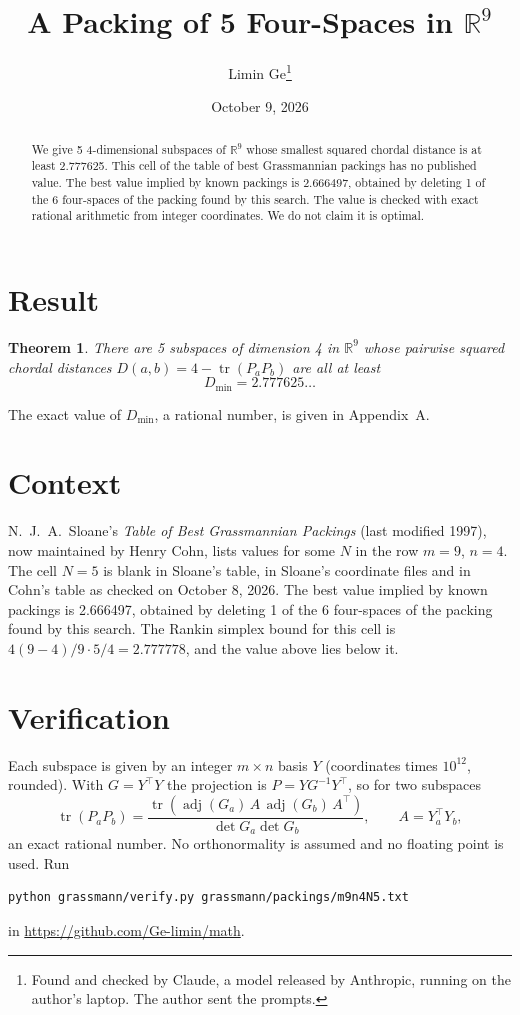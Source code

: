 \documentclass[11pt,a4paper]{article}
\title{A Packing of 5 Four-Spaces in $\mathbb{R}^{9}$}
\author{Limin Ge\thanks{Found and checked by Claude, a model released by Anthropic, running on the author's laptop. The author sent the prompts.}}
\date{October 9, 2026}
\newtheorem*{theorem}{Theorem}
\begin{document}
\maketitle
\begin{abstract}
We give 5 4-dimensional subspaces of $\mathbb{R}^{9}$ whose smallest squared chordal distance is at least 2.777625. This cell of the table of best Grassmannian packings has no published value. The best value implied by known packings is 2.666497, obtained by deleting 1 of the 6 four-spaces of the packing found by this search. The value is checked with exact rational arithmetic from integer coordinates. We do not claim it is optimal.
\end{abstract}

\section{Result}
\begin{theorem}
There are 5 subspaces of dimension 4 in $\mathbb{R}^{9}$ whose pairwise squared chordal distances $D(a,b) = 4 - \operatorname{tr}(P_aP_b)$ are all at least
\[ D_{\min} = 2.777625\ldots \]
\end{theorem}
The exact value of $D_{\min}$, a rational number, is given in Appendix~A.


\section{Context}
N.~J.~A.~Sloane's \emph{Table of Best Grassmannian Packings} (last modified 1997), now maintained by Henry Cohn, lists values for some $N$ in the row $m=9$, $n=4$. The cell $N=5$ is blank in Sloane's table, in Sloane's coordinate files and in Cohn's table as checked on October 8, 2026. The best value implied by known packings is 2.666497, obtained by deleting 1 of the 6 four-spaces of the packing found by this search. The Rankin simplex bound for this cell is $4(9-4)/9\cdot 5/4 = 2.777778$, and the value above lies below it.


\section{Verification}
Each subspace is given by an integer $m\times n$ basis $Y$ (coordinates times $10^{12}$, rounded). With $G=Y^\top Y$ the projection is $P=YG^{-1}Y^\top$, so for two subspaces
\[ \operatorname{tr}(P_aP_b)=\frac{\operatorname{tr}(\operatorname{adj}(G_a)\,A\,\operatorname{adj}(G_b)\,A^\top)}{\det G_a\det G_b},\qquad A=Y_a^\top Y_b, \]
an exact rational number. No orthonormality is assumed and no floating point is used. Run
\begin{verbatim}
python grassmann/verify.py grassmann/packings/m9n4N5.txt
\end{verbatim}
in \url{https://github.com/Ge-limin/math}.
\end{document}
